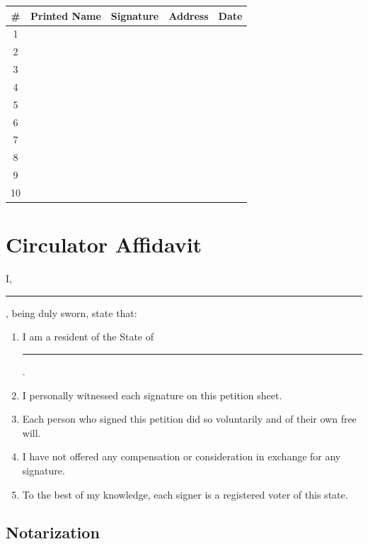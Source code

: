 \documentclass[11pt, letterpaper]{article}
\begin{document}
\vspace{0.5em}
\begin{center}
\begin{tabularx}{\textwidth}{|c|X|X|X|X|}
\hline
\rowcolor{afp-teal!10}
\textbf{\#} & \textbf{Printed Name} & \textbf{Signature} & \textbf{Address} & \textbf{Date} \\
\hline
1 & & & & \\[0.9cm] \hline
2 & & & & \\[0.9cm] \hline
3 & & & & \\[0.9cm] \hline
4 & & & & \\[0.9cm] \hline
5 & & & & \\[0.9cm] \hline
6 & & & & \\[0.9cm] \hline
7 & & & & \\[0.9cm] \hline
8 & & & & \\[0.9cm] \hline
9 & & & & \\[0.9cm] \hline
10 & & & & \\[0.9cm] \hline
\end{tabularx}
\end{center}

\section{Circulator Affidavit}

I, \rule{6cm}{0.4pt}, being duly sworn, state that:

\begin{enumerate}
  \item I am a resident of the State of \rule{4cm}{0.4pt}.
  \item I personally witnessed each signature on this petition sheet.
  \item Each person who signed this petition did so voluntarily and of their own free will.
  \item I have not offered any compensation or consideration in exchange for any signature.
  \item To the best of my knowledge, each signer is a registered voter of this state.
\end{enumerate}



\subsection{Notarization}
\end{document}
